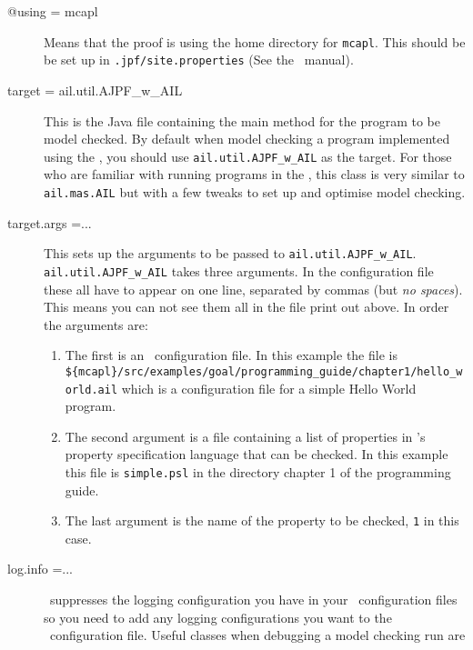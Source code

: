 \begin{sloppypar}
\begin{description}
\item[@using = mcapl] Means that the proof is using the home directory for \texttt{mcapl}.  This should be be set up in \texttt{.jpf/site.properties} (See the \mcapl\ manual).
\item[target = ail.util.AJPF\_w\_AIL] This is the Java file containing the main method for the program to be model checked.  By default when model checking a program implemented using the \ail, you should use \texttt{ail.util.AJPF\_w\_AIL} as the target.  For those who are familiar with running programs in the \ail, this class is very similar to \texttt{ail.mas.AIL} but with a few tweaks to set up and optimise model checking.
\item[target.args =...] This sets up the arguments to be passed to \texttt{ail.util.AJPF\_w\_AIL}.  \texttt{ail.util.AJPF\_w\_AIL} takes three arguments.  In the configuration file these all have to appear on one line, separated by commas (but \emph{no spaces}).  This means you can not see them all in the file print out above.  In order the arguments are:
\begin{enumerate}
\item The first is an \ail\ configuration file.  In this example the file is \texttt{\$\{mcapl\}/src/examples/goal/programming\_guide/chapter1/hello\_world.ail} which is a configuration file for a simple Hello World program.
\item The second argument is a file containing a list of properties in \ajpf's property specification language that can be checked.  In this example this file is \texttt{simple.psl} in the directory chapter 1 of the programming guide.
\item The last argument is the name of the property to be checked, \texttt{1} in this case.
\end{enumerate}
\item[log.info =... ] \jpf\ suppresses the logging configuration you have in your \ail\ configuration files so you need to add any logging configurations you want to the \jpf\ configuration file.  Useful classes when debugging a model checking run are


\end{description}
\end{sloppypar}
